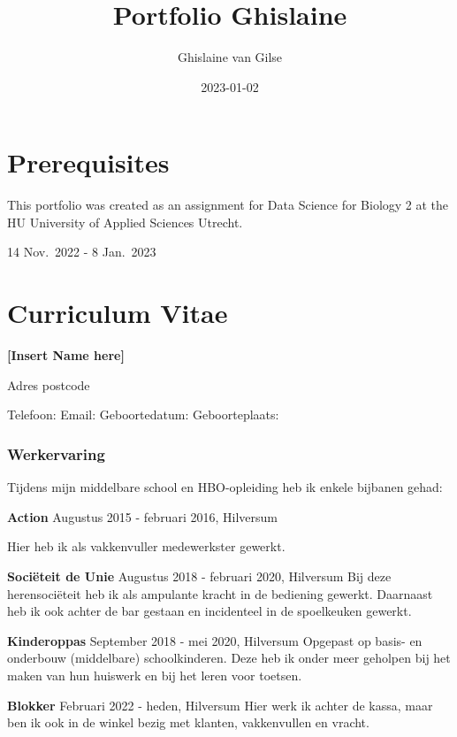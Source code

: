 \documentclass[
]{book}
\title{Portfolio Ghislaine}
\author{Ghislaine van Gilse}
\date{2023-01-02}
\begin{document}
\maketitle

{
\setcounter{tocdepth}{1}
\tableofcontents
}
\hypertarget{prerequisites}{%
\chapter*{Prerequisites}\label{prerequisites}}

This portfolio was created as an assignment for Data Science for Biology 2 at the HU University of Applied Sciences Utrecht.

14 Nov.~2022 - 8 Jan.~2023

\hypertarget{curriculum-vitae}{%
\chapter*{Curriculum Vitae}\label{curriculum-vitae}}

\textbf{{[}Insert Name here{]}}

Adres
postcode

Telefoon:
Email:
Geboortedatum:
Geboorteplaats:

\hypertarget{werkervaring}{%
\subsection*{Werkervaring}\label{werkervaring}}

Tijdens mijn middelbare school en HBO-opleiding heb ik enkele bijbanen gehad:

\textbf{Action}
Augustus 2015 - februari 2016, Hilversum

Hier heb ik als vakkenvuller medewerkster gewerkt.

\textbf{Sociëteit de Unie}
Augustus 2018 - februari 2020, Hilversum
Bij deze herensociëteit heb ik als ampulante kracht in de bediening gewerkt. Daarnaast heb ik ook achter de bar gestaan en incidenteel in de spoelkeuken gewerkt.

\textbf{Kinderoppas}
September 2018 - mei 2020, Hilversum
Opgepast op basis- en onderbouw (middelbare) schoolkinderen. Deze heb ik onder meer geholpen bij het maken van hun huiswerk en bij het leren voor toetsen.

\textbf{Blokker}
Februari 2022 - heden, Hilversum
Hier werk ik achter de kassa, maar ben ik ook in de winkel bezig met klanten, vakkenvullen en vracht.
\end{document}
